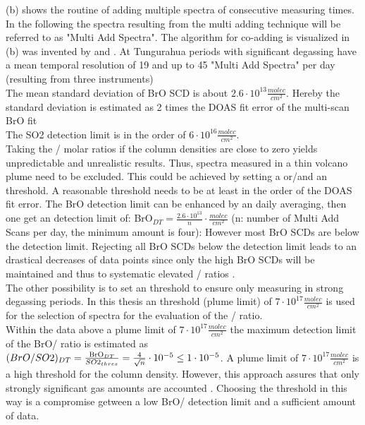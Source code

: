  (b) shows the routine of adding multiple spectra of consecutive measuring times. In the following the spectra resulting from the multi adding technique will be referred to as "Multi Add Spectra". The algorithm for co-adding is visualized in  (b) was invented by \citet{vogel2011volcanic} and \citet{lubcke2014bro}. At Tungurahua periods with significant degassing have a mean temporal resolution of 19 and up to 45 "Multi Add Spectra" per day (resulting from three instruments)\\

The mean standard deviation of BrO SCD is about $2.6\cdot10^{13} \frac{molec}{cm^{2}}$. Hereby the standard deviation is estimated as 2 times the DOAS fit error of the multi-scan BrO fit \citet{Stutz:96} \\
%
The SO2	detection limit is in the order of $6\cdot10^{16}\frac{molec}{cm^{2}}$.\\
%
Taking the / molar ratios if the column densities are close to zero yields unpredictable and unrealistic results. 
Thus, spectra measured in a thin volcano plume need to be excluded.
This could be achieved by setting a  or/and an  threshold. A reasonable  threshold needs to be at least in the order of the DOAS fit error. The BrO detection limit can be enhanced by an daily averaging, then one get an detection limit of: BrO$_{DT}=\frac{2.6\cdot10^{13}}{n}\cdot\frac{molec}{cm^{2}}$ (n: number of Multi Add Scans per day, the minimum amount is four): However most BrO SCDs are below the detection limit.
Rejecting all BrO SCDs below the detection limit leads to an drastical decreases of data points since only the high BrO SCDs will be maintained and thus to systematic elevated / ratios  \citep{lubcke2014bro}.\\
%
The other possibility is to set an  threshold to ensure only measuring in strong degassing periods. In this thesis an  threshold (plume limit) of $7\cdot 10^{17} \frac{molec}{cm^2}$ is used for the selection of spectra for the evaluation of the / ratio. \\
%
Within the data above a  plume limit of $7\cdot 10^{17} \frac{molec}{cm^2}$ the maximum detection limit of the BrO/ ratio is estimated as $(BrO/SO2)_{DT}	=	\frac{\ce{BrO}_{DT}}{SO2_{thres}}=\frac{4	}{\sqrt{n}}\cdot10^{-5}	 \leq 	1\cdot10^{-5}$.
A plume limit of $7\cdot 10^{17} \frac{molec}{cm^2}$ is a high threshold for the column density. However, this approach assures that only strongly significant gas amounts are accounted \citep{lubcke2014bro}. Choosing the  threshold in this way is a compromise getween a low BrO/ detection limit and a sufficient amount of data.\\

